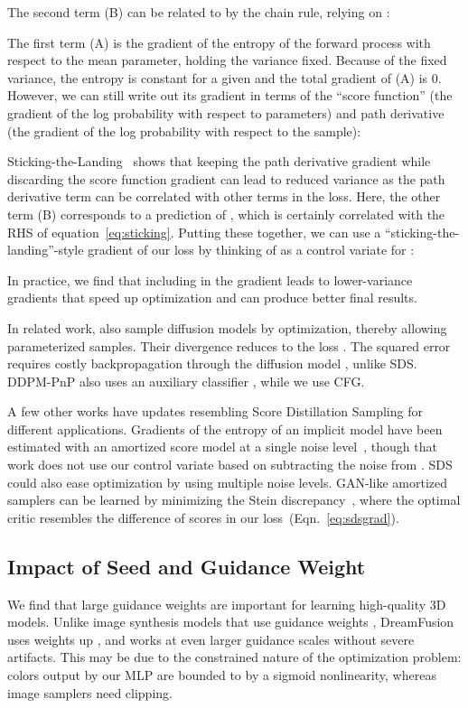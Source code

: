 \documentclass{article} \usepackage{iclr2023_conference,times}
\def\eqref#1{equation~\ref{#1}}
\newcommand{\sname}{Score Distillation Sampling\xspace}
\newcommand{\sacc}{SDS\xspace}
\newcommand{\dreamfusion}{DreamFusion\xspace}
\begin{document}
The second term (B) can be related to  by the chain rule, relying on :

The first term (A) is the gradient of the entropy of the forward process with respect to the mean parameter, holding the variance fixed. Because of the fixed variance, the entropy is constant for a given  and the total gradient of (A) is 0. However, we can still write out its gradient in terms of the ``score function'' (the gradient of the log probability with respect to parameters) and path derivative (the gradient of the log probability with respect to the sample):

Sticking-the-Landing~\citep{stickingthelanding} shows that keeping the path derivative gradient while discarding the score function gradient can lead to reduced variance as the path derivative term can be correlated with other terms in the loss. Here, the other term (B) corresponds to a prediction of , which is certainly correlated with the RHS of \eqref{eq:sticking}. Putting these together, we can use a ``sticking-the-landing''-style gradient of our loss by thinking of  as a control variate for :

In practice, we find that including  in the gradient leads to lower-variance gradients that speed up optimization and can produce better final results.








In related work, \citet{ddpmpnp} also sample diffusion models by optimization, thereby allowing parameterized samples. Their divergence  reduces to the loss . The squared error requires costly backpropagation through the diffusion model , unlike \sacc. DDPM-PnP also uses an auxiliary classifier , while we use CFG.

A few other works have updates resembling \sname for different applications. Gradients of the entropy of an implicit model have been estimated with an amortized score model at a single noise level~\citep{DBLP:journals/corr/abs-2006-05164}, though that work does not use our control variate based on subtracting the noise from . SDS could also ease optimization by using multiple noise levels. GAN-like amortized samplers can be learned by minimizing the Stein discrepancy~\citep{steinns, pmlr-v119-grathwohl20a}, where the optimal critic resembles the difference of scores in our loss~(Eqn.~\ref{eq:sdsgrad}).


\subsection{Impact of Seed and Guidance Weight}
We find that large guidance weights are important for learning high-quality 3D models. Unlike image synthesis models that use guidance weights , \dreamfusion uses weights up , and works at even larger guidance scales without severe artifacts. This may be due to the constrained nature of the optimization problem: colors output by our MLP are bounded to  by a sigmoid nonlinearity, whereas image samplers need clipping.
\end{document}
